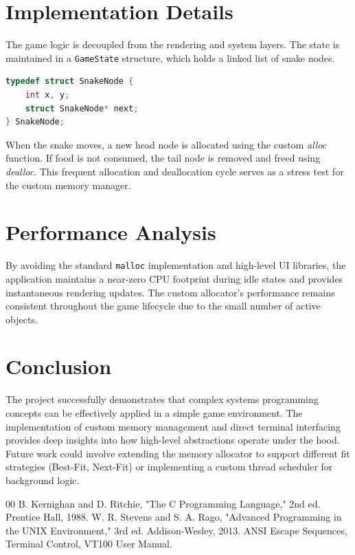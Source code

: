 \documentclass[conference]{IEEEtran}
\begin{document}
\section{Implementation Details}
The game logic is decoupled from the rendering and system layers. The state is maintained in a \texttt{GameState} structure, which holds a linked list of snake nodes.

\begin{lstlisting}[language=C, caption=Snake Node Structure]
typedef struct SnakeNode {
    int x, y;
    struct SnakeNode* next;
} SnakeNode;
\end{lstlisting}

When the snake moves, a new head node is allocated using the custom \textit{alloc} function. If food is not consumed, the tail node is removed and freed using \textit{dealloc}. This frequent allocation and deallocation cycle serves as a stress test for the custom memory manager.

\section{Performance Analysis}
By avoiding the standard \texttt{malloc} implementation and high-level UI libraries, the application maintains a near-zero CPU footprint during idle states and provides instantaneous rendering updates. The custom allocator's performance remains consistent throughout the game lifecycle due to the small number of active objects.

\section{Conclusion}
The project successfully demonstrates that complex systems programming concepts can be effectively applied in a simple game environment. The implementation of custom memory management and direct terminal interfacing provides deep insights into how high-level abstractions operate under the hood. Future work could involve extending the memory allocator to support different fit strategies (Best-Fit, Next-Fit) or implementing a custom thread scheduler for background logic.

\begin{thebibliography}{00}
 B. Kernighan and D. Ritchie, "The C Programming Language," 2nd ed. Prentice Hall, 1988.
 W. R. Stevens and S. A. Rago, "Advanced Programming in the UNIX Environment," 3rd ed. Addison-Wesley, 2013.
 ANSI Escape Sequences, Terminal Control, VT100 User Manual.
\end{thebibliography}
\end{document}
